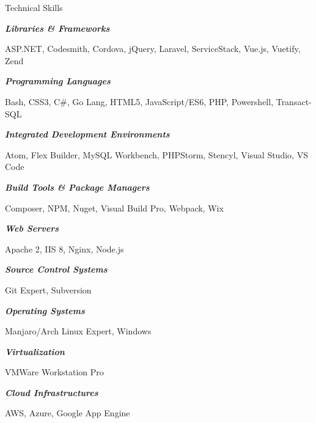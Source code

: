 \documentclass{resume} %
\begin{document}

\begin{rSection}{Technical Skills}

\begin{rSubsection}{}{}{}{}

\item[] \textbf{\textit{Libraries \& Frameworks}}
\item ASP.NET, Codesmith, Cordova, jQuery, Laravel, ServiceStack, Vue.js, Vuetify, Zend
\smallskip

\item[] \textbf{\textit{Programming Languages}}
\item Bash, CSS3, C\#, Go Lang, HTML5, JavaScript/ES6, PHP, Powershell, Transact-SQL
\vspace{3mm}

\item[] \textbf{\textit{Integrated Development Environments}}
\item Atom, Flex Builder, MySQL Workbench, PHPStorm, Stencyl, Visual Studio, VS Code
\vspace{3mm}

\item[] \textbf{\textit{Build Tools \& Package Managers}}
\item Composer, NPM, Nuget, Visual Build Pro, Webpack, Wix
\vspace{3mm}

\item[] \textbf{\textit{Web Servers}}
\item Apache 2, IIS 8, Nginx, Node.js
\vspace{3mm}

\item[] \textbf{\textit{Source Control Systems}}
\item Git Expert, Subversion
\vspace{3mm}

\item[] \textbf{\textit{Operating Systems}}
\item Manjaro/Arch Linux Expert, Windows
\vspace{3mm}

\item[] \textbf{\textit{Virtualization}}
\item VMWare Workstation Pro
\vspace{3mm}

\item[] \textbf{\textit{Cloud Infrastructures}}
\item AWS, Azure, Google App Engine

\end{rSubsection}

\end{rSection}
\end{document}
